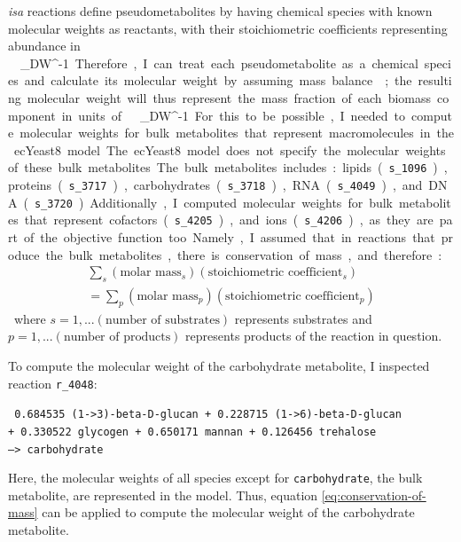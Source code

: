 \textit{isa} reactions define pseudometabolites by having chemical species with known molecular weights as reactants, with their stoichiometric coefficients representing abundance in \SI{}{\milli\mol~\gram_{DW}^{-1}}.
Therefore, I can treat each pseudometabolite as a chemical species and calculate its molecular weight by assuming mass balance \parencite{chanStandardizingBiomassReactions2017, dinhQuantifyingPropagationParametric2022, takhaveevTemporalSegregationBiosynthetic2023};
the resulting molecular weight will thus represent the mass fraction of each biomass component in units of \SI{}{\gram~\gram_{DW}^{-1}}.

For this to be possible, I needed to compute molecular weights for bulk metabolites that represent macromolecules in the ecYeast8 model.
The ecYeast8 model does not specify the molecular weights of these bulk metabolites.
The bulk metabolites includes: lipids (\texttt{s\_1096}), proteins (\texttt{s\_3717}), carbohydrates (\texttt{s\_3718}), RNA (\texttt{s\_4049}), and DNA (\texttt{s\_3720}).
Additionally, I computed molecular weights for bulk metabolites that represent cofactors (\texttt{s\_4205}), and ions (\texttt{s\_4206}), as they are part of the objective function too.
Namely, I assumed that in reactions that produce the bulk metabolites, there is conservation of mass, and therefore:

\begin{equation}
\label{eq:conservation-of-mass}
  \begin{aligned}
    \sum_{s}(\text{molar mass}_{s})(\text{stoichiometric coefficient}_{s}) \\ = \sum_{p}(\text{molar mass}_{p})(\text{stoichiometric coefficient}_{p})
  \end{aligned}
\end{equation}

where $s = 1, ... (\text{number of substrates})$ represents substrates and $p = 1, ... (\text{number of products})$ represents products of the reaction in question.

To compute the molecular weight of the carbohydrate metabolite, I inspected reaction \texttt{r\_4048}:

\texttt{
  0.684535 (1->3)-beta-D-glucan + 0.228715 (1->6)-beta-D-glucan \\
  + 0.330522 glycogen + 0.650171 mannan + 0.126456 trehalose \\
  --> carbohydrate
}

Here, the molecular weights of all species except for \texttt{carbohydrate}, the bulk metabolite, are represented in the model.
Thus, equation \ref{eq:conservation-of-mass} can be applied to compute the molecular weight of the carbohydrate metabolite.

